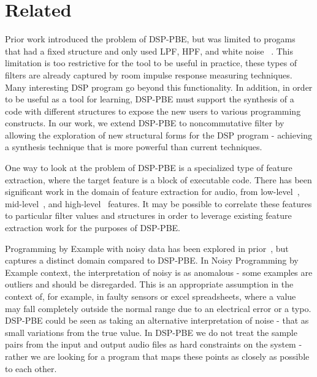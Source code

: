 \section{Related}

Prior work introduced the problem of DSP-PBE, but was limited to progams that had a fixed structure and only used LPF, HPF, and white noise~\cite{SantolucitoFARM} .
This limitation is too restrictive for the tool to be useful in practice, these types of filters are already captured by room impulse response measuring techniques.
Many interesting DSP program go beyond this functionality.
In addition, in order to be useful as a tool for learning, DSP-PBE must support the synthesis of a code with different structures to expose the new users to various programming constructs.
In our work, we extend DSP-PBE to noncommutative filter by allowing the exploration of new structural forms for the DSP program - achieving a synthesis technique that is more powerful than current techniques.

One way to look at the problem of DSP-PBE is a specialized type of feature extraction, where the target feature is a block of executable code.
There has been significant work in the domain of feature extraction for audio, from low-level~\cite{muller2011chroma}, mid-level~\cite{AljanakiS18}, and high-level~\cite{PandaMP18, mathieu2010yaafe, lidy2005evaluation} features.
It may be possible to correlate these features to particular filter values and structures in order to leverage existing feature extraction work for the purposes of DSP-PBE.

Programming by Example with noisy data has been explored in prior~\cite{raychev2016learning}, but captures a distinct domain compared to DSP-PBE.
In Noisy Programming by Example context, the interpretation of noisy is as anomalous - some examples are outliers and should be disregarded.
This is an appropriate assumption in the context of, for example, in faulty sensors or excel spreadsheets, where a value may fall completely outside the normal range due to an electrical error or a typo.
DSP-PBE could be seen as taking an alternative interpretation of noise - that as small variations from the true value.
In DSP-PBE we do not treat the sample pairs from the input and output audio files as hard constraints on the system - rather we are looking for a program that maps these points as closely as possible to each other.

